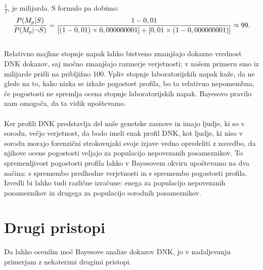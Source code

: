 \documentclass[12pt,a4paper]{amsart}
\theoremstyle{definition} %
\theoremstyle{plain} %
\begin{document}
$\frac{1}{f}$, je milijarda. S formulo pa dobimo:
\[
   \frac{P(M_p \lvert S)}{P(M_p \lvert \neg S)} = \frac{1 - 0,01}{[(1 - 0,01) \times 0,000000001] + [0,01 \times (1 - 0,000000001)]} \approx 99. \vspace{2mm}
\]\\
Relativno majhne stopnje napak lahko bistveno zmanjšajo dokazno vrednost DNK dokazov, saj močno zmanjšajo razmerje verjetnosti; v našem primeru
smo iz milijarde prišli na pribljižno 100. Vpliv stopnje laboratorijskih napak kaže, da ne glede na to, kako nizka se izkaže pogostost profila,
bo ta relativno nepomembna, če pogostosti ne spremlja ocena stopnje laboratorijskih napak. Bayesovo pravilo nam omogoča, da ta vidik upoštevamo.\\\\
Ker profili DNK predstavlja del naše genetske zasnove in imajo ljudje, ki so v sorodu, večjo verjetnost, da bodo imeli enak profil DNK, kot ljudje,
ki niso v sorodu morajo forenzični strokovnjaki svoje izjave vedno opredeliti z navedbo, da njihove ocene pogostosti veljajo za populacijo nepovezanih
posameznikov. To spremenljivost pogostosti profila lahko v Bayesovem okviru upoštevamo na dva načina: s spremembo predhodne verjetnosti in s
spremembo pogostosti profila. Izvedli bi lahko tudi različne izračune: enega za populacijo nepovezanih posameznikov in drugega za populacijo
sorodnih posameznikov.

\section{Drugi pristopi}
Da lahko ocenilm moč Bayesove analize dokazov DNK, jo v nadaljevanju primerjam z nekaterimi drugimi pristopi.

\end{document}
